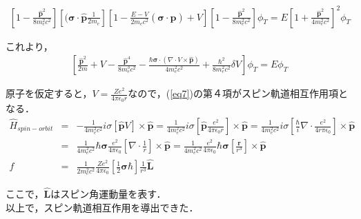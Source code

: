 \documentclass[10pt]{ujarticle}
\begin{document}
\begin{eqnarray}
\left[ 1- \frac{\bm{\hat{p}}^2}{8m_e^2 c^2} \right] \left[(\bm{\sigma} \cdot \bm{\hat{p}} \frac{1}{2m_e} \right] \left[ 1- \frac{E-V}{2m_e c^2} (\bm{\sigma} \cdot \bm{\hat{p}})+V \right] \left[ 1- \frac{\bm{\hat{p}}^2}{8m_e^2 c^2} \right] \phi_T = E \left[ 1+ \frac{\bm{\hat{p}}^2}{4m_e^2 c^2} \right] ^2 \phi_T
\end{eqnarray}

これより，
\begin{eqnarray}
  \label{eq7}
  \left[ \frac{\bm{\hat{p}}^2}{2m}+V -\frac{\bm{\hat{p}}^4}{8m_e^3 c^2} - \frac{\hbar \bm{\sigma} \cdot(\nabla \cdot V \times \bm{\hat{p}})}{4m_e^2 c^2} + \frac{\hbar^2}{8m_e^2 c^2} \delta V \right] \phi_T = E\phi_T
\end{eqnarray}

原子を仮定すると，$V=\frac{Ze^2}{4\pi \epsilon_0 r}$なので，(\ref{eq7})の第４項がスピン軌道相互作用項となる．
\begin{eqnarray}
  \hat{H}_{spin-orbit} &=& -\frac{1}{4m_e^2 c^2} i\sigma \left[\bm{\hat{p}} V\right] \times \bm{\hat{p}} = \frac{1}{4m_e^2 c^2} i\sigma \left[\bm{\hat{p}} \frac{e^2}{4\pi \epsilon_0 r}\right] \times \bm{\hat{p}} = \frac{1}{4m_e^2 c^2} i\sigma \left[ \frac{\hbar}{i} \nabla \cdot \frac{e^2}{4r\pi \epsilon_0} \right] \times \bm{\hat{p}} \\
  &=& \frac{1}{4 m_e^2 c^2}\hbar \bm{\sigma} \frac{e^2}{4\pi \epsilon_0} \left[ \nabla \cdot \frac{1}{r} \right] \times \bm{\hat{p}} = \frac{1}{4m_e^2 c^2} \frac{e^2}{4\pi \epsilon_0} \hbar \bm{\sigma} \left[ \frac{\bm{r}}{r^3} \right] \times \bm{\hat{p}} \\f
  &=& \frac{1}{2m_e^2 c^2} \frac{Ze^2}{4\pi \epsilon_0} \left[ \frac{1}{2} \bm{\sigma} \hbar \right] \frac{1}{r^3} \bm{\hat{L}}
\end{eqnarray}

ここで，$\bm{\hat{L}}$はスピン角運動量を表す．\\
以上で，スピン軌道相互作用を導出できた．







%
%
\end{document}
